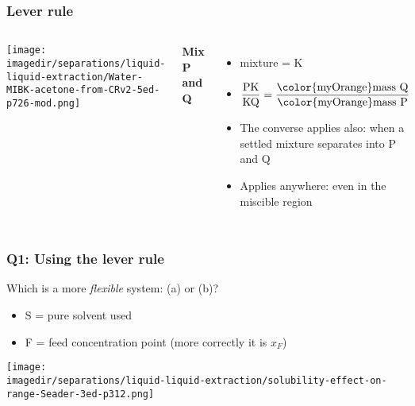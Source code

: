 
\begin{frame}\frametitle{Lever rule}
	\begin{columns}[t]
			\begin{center}
				\texttt{[image: \\imagedir/separations/liquid-liquid-extraction/Water-MIBK-acetone-from-CRv2-5ed-p726-mod.png]}
			\end{center}
			\textbf{Mix P and Q}
			
			\begin{itemize}
				\item	mixture = K
				\vspace{12pt}
				\item	$\displaystyle \frac{\text{PK}}{\text{KQ}} = \displaystyle\frac{\text{{\color{myOrange}mass} Q}}{\text{{\color{myOrange}mass} P}}$
				\vspace{8pt}
				\item	The converse applies also: when a settled mixture separates into P and Q
				\item	Applies anywhere: even in the miscible region
			\end{itemize}
	\end{columns}
\end{frame}

\begin{frame}\frametitle{Q1: Using the lever rule}
	Which is a more \emph{flexible} system: (a) or (b)?
	\begin{itemize}
		\item	S = pure solvent used 
		\item	F = feed concentration point (more correctly it is $x_F$)
	\end{itemize}
	
	\begin{center}
		\texttt{[image: \\imagedir/separations/liquid-liquid-extraction/solubility-effect-on-range-Seader-3ed-p312.png]}
	\end{center}
	
	\iftoggle{student}{
		Answer: \pause range of feed concentrations ($x_F$) is wider, i.e. more desirable, for \textbf{(a)}. Difference between (a) and (b): 
		\begin{itemize}
			\item	due to solvent choice 
			\item	due to different temperatures
			\item	due to pH modification, \emph{etc}
		\end{itemize}
	}{Answer: }
\end{frame}

